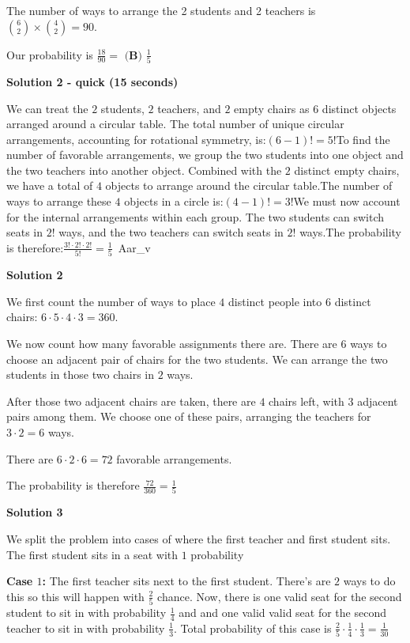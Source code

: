 \begin{enumerate}
 The number of ways to arrange the 2 students and 2 teachers is $\binom{6}{2} \times \binom{4}{2} = 90$.

 Our probability is \( \frac{18}{90} = \) $\boxed{\textbf{(B) } \frac 15}$




\textbf{Solution 2 - quick (15 seconds)}

We can treat the \(2\) students, \(2\) teachers, and \(2\) empty chairs as \(6\) distinct objects arranged around a circular table. The total number of unique circular arrangements, accounting for rotational symmetry, is:\((6-1)!=5!\)To find the number of favorable arrangements, we group the two students into one object and the two teachers into another object. Combined with the \(2\) distinct empty chairs, we have a total of \(4\) objects to arrange around the circular table.The number of ways to arrange these \(4\) objects in a circle is:\((4-1)!=3!\)We must now account for the internal arrangements within each group. The two students can switch seats in \(2!\) ways, and the two teachers can switch seats in \(2!\) ways.The probability is therefore:\(\frac{3!\cdot 2!\cdot 2!}{5!}=\boxed{\frac{1}{5}}\)~Aar\_v

 



\textbf{Solution 2}

We first count the number of ways to place $4$ distinct people into $6$ distinct chairs: $6\cdot5\cdot4\cdot3 = 360$.

 We now count how many favorable assignments there are. There are $6$ ways to choose an adjacent pair of chairs for the two students. We can arrange the two students in those two chairs in $2$ ways.

 After those two adjacent chairs are taken, there are $4$ chairs left, with $3$ adjacent pairs among them. We choose one of these pairs, arranging the teachers for $3 \cdot 2 = 6$ ways.

 There are $6\cdot 2 \cdot 6 = 72$ favorable arrangements.

 The probability is therefore $\frac{72}{360} = \boxed{\frac{1}{5}}$




\textbf{Solution 3}

We split the problem into cases of where the first teacher and first student sits. The first student sits in a seat with $1$ probability

 


 \textbf{Case $1$:} The first teacher sits next to the first student. There's are $2$ ways to do this so this will happen with $\frac{2}{5}$ chance. Now, there is one valid seat for the second student to sit in with probability $\frac{1}{4}$ and and one valid valid seat for the second teacher to sit in with probability $\frac{1}{3}$. Total probability of this case is $\frac{2}{5}\cdot \frac{1}{4}\cdot \frac{1}{3} = \frac{1}{30}$


\end{enumerate}
